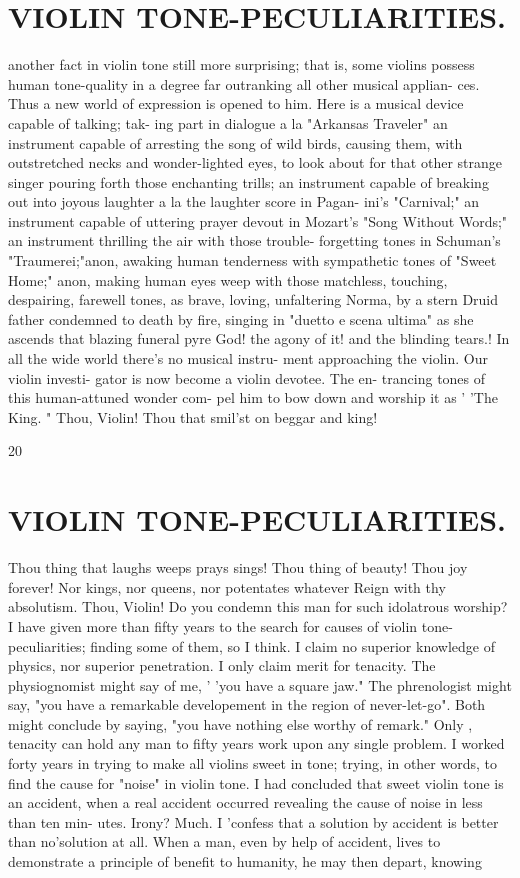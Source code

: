 \documentclass{article}
\begin{document}
\section*{VIOLIN TONE-PECULIARITIES.}
another fact in violin tone still more surprising; that is, some violins possess human tone-quality in a degree far outranking all other musical applian- ces. Thus a new world of expression is opened to him. Here is a musical device capable of talking; tak- ing part in dialogue a la "Arkansas Traveler" an instrument capable of arresting the song of wild birds, causing them, with outstretched necks and wonder-lighted eyes, to look about for that other strange singer pouring forth those enchanting trills; an instrument capable of breaking out into joyous laughter a la the laughter score in Pagan- ini's "Carnival;" an instrument capable of uttering prayer devout in Mozart's "Song Without Words;" an instrument thrilling the air with those trouble- forgetting tones in Schuman's "Traumerei;"anon, awaking human tenderness with sympathetic tones of "Sweet Home;" anon, making human eyes weep with those matchless, touching, despairing, farewell tones, as brave, loving, unfaltering Norma, by a stern Druid father condemned to death by fire, singing in "duetto e scena ultima" as she ascends that blazing funeral pyre God! the agony of it! and the blinding tears.! In all the wide world there's no musical instru- ment approaching the violin. Our violin investi- gator is now become a violin devotee. The en- trancing tones of this human-attuned wonder com- pel him to bow down and worship it as ' 'The King. " Thou, Violin! Thou that smil'st on beggar and king!

20

\section*{VIOLIN TONE-PECULIARITIES.}
Thou thing that laughs weeps prays sings! Thou thing of beauty! Thou joy forever! Nor kings, nor queens, nor potentates whatever Reign with thy absolutism. Thou, Violin! Do you condemn this man for such idolatrous worship? I have given more than fifty years to the search for causes of violin tone-peculiarities; finding some of them, so I think. I claim no superior knowledge of physics, nor superior penetration. I only claim merit for tenacity. The physiognomist might say of me, ' 'you have a square jaw." The phrenologist might say, "you have a remarkable developement in the region of never-let-go". Both might conclude by saying, "you have nothing else worthy of remark." Only , tenacity can hold any man to fifty years work upon any single problem. I worked forty years in trying to make all violins sweet in tone; trying, in other words, to find the cause for "noise" in violin tone. I had concluded that sweet violin tone is an accident, when a real accident occurred revealing the cause of noise in less than ten min- utes. Irony? Much. I 'confess that a solution by accident is better than no'solution at all. When a man, even by help of accident, lives to demonstrate a principle of benefit to humanity, he may then depart, knowing
\end{document}
